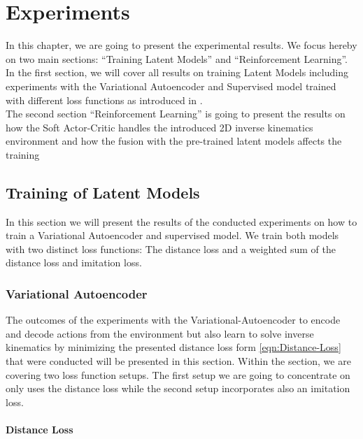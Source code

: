 \chapter{Experiments}\label{chap:experiments}

In this chapter, we are going to present the experimental results. We focus hereby on two main sections: ``Training Latent Models'' and ``Reinforcement Learning''. In the first section, we will cover all results on training Latent Models including experiments with the Variational Autoencoder and Supervised model trained with different loss functions as introduced in . \\
The second section ``Reinforcement Learning'' is going to present the results on how the Soft Actor-Critic handles the introduced 2D inverse kinematics environment and how the fusion with the pre-trained latent models affects the training


\section{Training of Latent Models}

In this section we will present the results of the conducted experiments on how to train a Variational Autoencoder and supervised model. We train both models with two distinct loss functions: The distance loss and a weighted sum of the distance loss and imitation loss. 

\subsection{Variational Autoencoder}

The outcomes of the experiments with the Variational-Autoencoder to encode and decode actions from the environment but also learn to solve inverse kinematics by minimizing the presented distance loss form \eqref{eqn:Distance-Loss} that were conducted will be presented in this section. Within the section, we are covering two loss function setups. The first setup we are going to concentrate on only uses the distance loss while the second setup incorporates also an imitation loss.

\subsubsection{Distance Loss}


